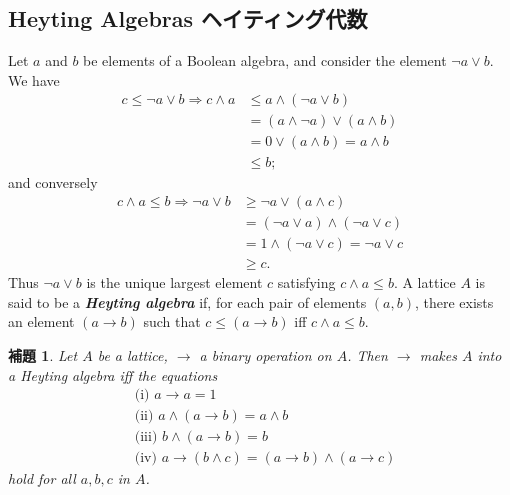 \documentclass[a4j,12pt]{jarticle}
\numberwithin{equation}{section}
\newcommand{\itbf}[1]{\textit{\textbf{#1}}}
\newtheorem{lemma}[thm]{補題}
\begin{document}
\subsection{Heyting Algebras ヘイティング代数}
Let $a$ and $b$ be elements of a Boolean algebra, and consider the element $\neg a \vee b$.
We have
\begin{align*}
  c \le \neg a \vee b \Rightarrow c \wedge a &\le a \wedge (\neg a \vee b) \\
                                             &=(a \wedge \neg a) \vee (a \wedge b) \\
                                             &=0 \vee (a \wedge b) = a \wedge b \\
                                             &\le b;
\end{align*}
and conversely
\begin{align*}
  c \wedge a \le b \Rightarrow \neg a \vee b &\ge \neg a \vee (a \wedge c) \\
                                             &=(\neg a \vee a) \wedge (\neg a \vee c) \\
                                             &=1 \wedge (\neg a \vee c) = \neg a \vee c \\
                                             &\ge c.
\end{align*}
Thus $\neg a \vee b$ is the unique largest element $c$ satisfying $c \wedge a \le b$. A lattice $A$ is said to be a \itbf{Heyting algebra} if, for each pair of elements $(a,b)$, there exists an element $(a \rightarrow b)$ such that $c\le(a\rightarrow b)$ iff $c \wedge a \le b$.
\begin{lemma}
  Let $A$ be a lattice, $\rightarrow$ a binary operation on $A$. Then $\rightarrow$ makes $A$ into a Heyting algebra iff the equations
  \begin{align*}
    &\text{(i) } a \rightarrow a =1 \\
    &\text{(ii) } a \wedge (a \rightarrow b) = a \wedge b \\
    &\text{(iii) } b \wedge (a \rightarrow b) = b \\
    &\text{(iv) } a \rightarrow (b \wedge c) = (a \rightarrow b) \wedge (a \rightarrow c)
  \end{align*}
  hold for all $a,b,c$ in $A$.
\end{lemma}
\end{document}
